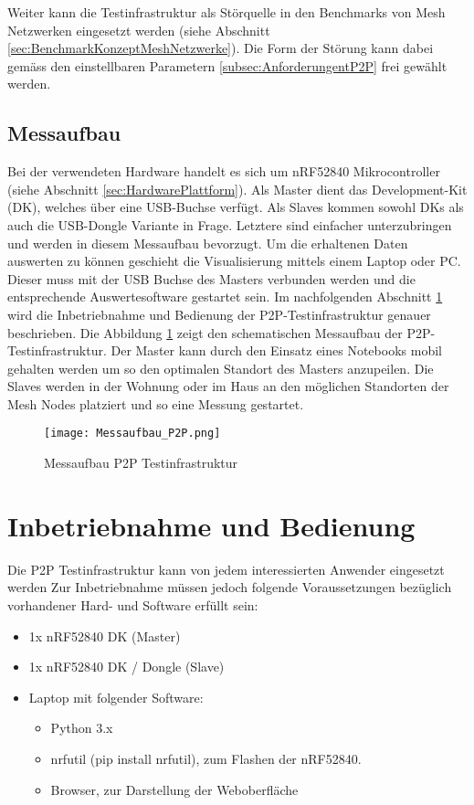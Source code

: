 Weiter kann die Testinfrastruktur als Störquelle in den Benchmarks von Mesh Netzwerken eingesetzt werden (siehe Abschnitt \ref{sec:BenchmarkKonzeptMeshNetzwerke}).
Die Form der Störung kann dabei gemäss den einstellbaren Parametern \ref{subsec:AnforderungentP2P} frei gewählt werden.

\subsection{Messaufbau}\label{sec:Messaufbau}

Bei der verwendeten Hardware handelt es sich um nRF52840 Mikrocontroller (siehe Abschnitt \ref{sec:HardwarePlattform}). Als Master dient das Development-Kit (DK), welches über eine USB-Buchse verfügt. Als Slaves kommen sowohl DKs als auch die USB-Dongle Variante in Frage. Letztere sind einfacher unterzubringen und werden in diesem Messaufbau bevorzugt. Um die erhaltenen Daten auswerten zu können geschieht die Visualisierung mittels einem Laptop oder PC. Dieser muss mit der USB Buchse des Masters verbunden werden und die entsprechende Auswertesoftware gestartet sein. Im nachfolgenden Abschnitt \ref{sec:InbetriebnahmeBedienungP2P} wird die Inbetriebnahme und Bedienung der P2P-Testinfrastruktur genauer beschrieben.
Die Abbildung \ref{fig:MessaufbauP2P} zeigt den schematischen Messaufbau der P2P-Testinfrastruktur. Der Master kann durch den Einsatz eines Notebooks mobil gehalten werden um so den optimalen Standort des Masters anzupeilen.
Die Slaves werden in der Wohnung oder im Haus an den möglichen Standorten der Mesh Nodes platziert und so eine Messung gestartet.

\begin{figure} [H]
	\centering
	\texttt{[image: Messaufbau\_P2P.png]}
	\caption{Messaufbau P2P Testinfrastruktur}
	\label{fig:MessaufbauP2P}
\end{figure}


\newpage
\section{Inbetriebnahme und Bedienung}\label{sec:InbetriebnahmeBedienungP2P}
Die P2P Testinfrastruktur kann von jedem interessierten Anwender eingesetzt werden
Zur Inbetriebnahme müssen jedoch folgende Voraussetzungen bezüglich vorhandener Hard- und Software erfüllt sein: 

\begin{itemize}
	\item 1x nRF52840 DK (Master)
	\item 1x nRF52840 DK / Dongle (Slave)
	\item Laptop mit folgender Software:
	\begin{itemize}
		\item Python 3.x
		\item nrfutil (pip install nrfutil), zum Flashen der nRF52840.
		\item Browser, zur Darstellung der Weboberfläche
	\end{itemize}
\end{itemize}

